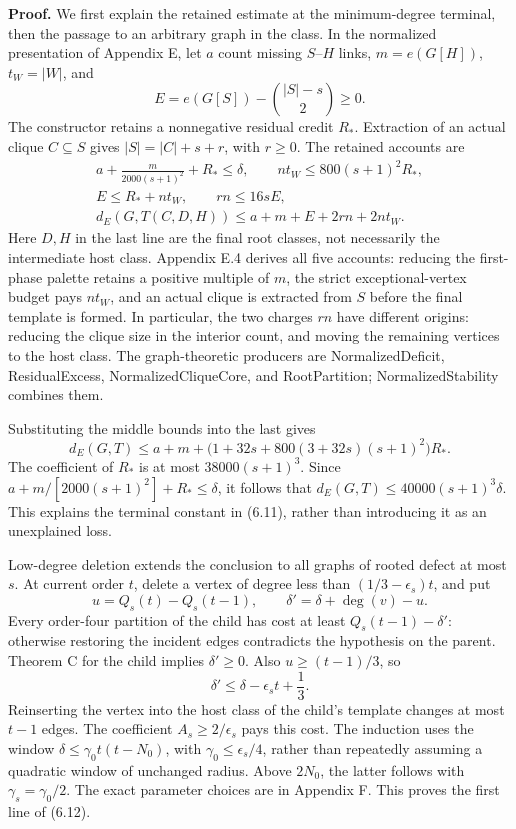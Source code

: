 \documentclass[english,11pt,a4paper]{article}
\begin{document}
\textbf{Proof.} We first explain the retained estimate at the minimum-degree terminal, then the passage to an arbitrary graph in the class. In the normalized presentation of Appendix E, let \(a\) count missing \(S\)--\(H\) links, \(m=e(G[H])\), \(t_W=|W|\), and \[
E=e(G[S])-\binom{|S|-s}{2}\ge0.
\] The constructor retains a nonnegative residual credit \(R_*\). Extraction of an actual clique \(C\subseteq S\) gives \(|S|=|C|+s+r\), with \(r\ge0\). The retained accounts are \[
\begin{gathered}
a+\frac{m}{2000(s+1)^2}+R_*\le\delta,\qquad
nt_W\le800(s+1)^2R_*,\\
E\le R_*+nt_W,\qquad rn\le16sE,\\
d_E(G,T(C,D,H))\le a+m+E+2rn+2nt_W.
\end{gathered}
\tag{6.14}
\] Here \(D,H\) in the last line are the final root classes, not necessarily the intermediate host class. Appendix E.4 derives all five accounts: reducing the first-phase palette retains a positive multiple of \(m\), the strict exceptional-vertex budget pays \(nt_W\), and an actual clique is extracted from \(S\) before the final template is formed. In particular, the two charges \(rn\) have different origins: reducing the clique size in the interior count, and moving the remaining vertices to the host class. The graph-theoretic producers are {\ttfamily\small NormalizedDe\discretionary{\hbox{\ensuremath{\hookrightarrow}}}{}{}ficit}, {\ttfamily\small ResidualExce\discretionary{\hbox{\ensuremath{\hookrightarrow}}}{}{}ss}, {\ttfamily\small NormalizedCl\discretionary{\hbox{\ensuremath{\hookrightarrow}}}{}{}iqueCore}, and {\ttfamily\small RootPartitio\discretionary{\hbox{\ensuremath{\hookrightarrow}}}{}{}n}; {\ttfamily\small NormalizedSt\discretionary{\hbox{\ensuremath{\hookrightarrow}}}{}{}ability} combines them.

Substituting the middle bounds into the last gives \[
d_E(G,T)\le a+m+
\bigl(1+32s+800(3+32s)(s+1)^2\bigr)R_*.
\] The coefficient of \(R_*\) is at most \(38000(s+1)^3\). Since \(a+m/[2000(s+1)^2]+R_*\le\delta\), it follows that \(d_E(G,T)\le40000(s+1)^3\delta\). This explains the terminal constant in (6.11), rather than introducing it as an unexplained loss.

Low-degree deletion extends the conclusion to all graphs of rooted defect at most \(s\). At current order \(t\), delete a vertex of degree less than \((1/3-\epsilon_s)t\), and put \[
u=Q_s(t)-Q_s(t-1),\qquad
\delta'=\delta+\deg(v)-u.
\tag{6.15}
\] Every order-four partition of the child has cost at least \(Q_s(t-1)-\delta'\): otherwise restoring the incident edges contradicts the hypothesis on the parent. Theorem C for the child implies \(\delta'\ge0\). Also \(u\ge(t-1)/3\), so \[
\delta'\le\delta-\epsilon_s t+\frac13.
\] Reinserting the vertex into the host class of the child's template changes at most \(t-1\) edges. The coefficient \(A_s\ge2/\epsilon_s\) pays this cost. The induction uses the window \(\delta\le\gamma_0t(t-N_0)\), with \(\gamma_0\le\epsilon_s/4\), rather than repeatedly assuming a quadratic window of unchanged radius. Above \(2N_0\), the latter follows with \(\gamma_s=\gamma_0/2\). The exact parameter choices are in Appendix F. This proves the first line of (6.12).
\end{document}
